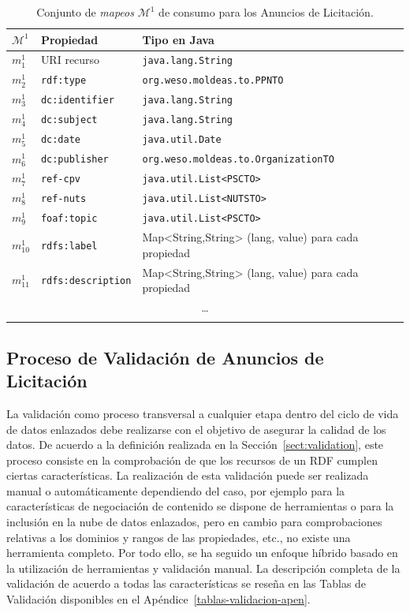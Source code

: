\begin{longtable}[c]{|p{2cm}|p{6cm}|p{6cm}|} 
\hline
  \textbf{$\mathcal{M}^1$} &  \textbf{Propiedad} & \textbf{Tipo en Java} \\\hline
\endhead
 $m^1_1$ & URI recurso     		& \texttt{java.lang.String} \\ \hline
 $m^1_2$ & \texttt{rdf:type}      	& \texttt{org.weso.moldeas.to.PPNTO} \\ \hline
 $m^1_3$ & \texttt{dc:identifier} 	& \texttt{java.lang.String} \\ \hline
 $m^1_4$ & \texttt{dc:subject}    	& \texttt{java.lang.String} \\ \hline
 $m^1_5$ & \texttt{dc:date}    		& \texttt{java.util.Date} \\ \hline
 $m^1_6$ & \texttt{dc:publisher}	& \texttt{org.weso.moldeas.to.OrganizationTO} \\ \hline 
 $m^1_7$ & \texttt{ref-cpv} 		& \texttt{java.util.List<PSCTO> } \\ \hline
 $m^1_8$ & \texttt{ref-nuts} 		& \texttt{java.util.List<NUTSTO> }\\ \hline
 $m^1_9$ & \texttt{foaf:topic} 	& \texttt{java.util.List<PSCTO> } \\ \hline
 $m^1_{10}$ &  \texttt{rdfs:label}  & Map<String,String> (lang, value) para cada propiedad \\ \hline   
 $m^1_{11}$ &  \texttt{rdfs:description}  & Map<String,String> (lang, value) para cada propiedad \\ \hline   
  \multicolumn{3}{|c|}{\ldots} \\ \hline
\hline
\caption{Conjunto de \textit{mapeos} $\mathcal{M}^1$ de consumo para los Anuncios de Licitación.}\label{table:ppn-consumo}\\    
\end{longtable}

\subsection{Proceso de Validación de Anuncios de Licitación}
La validación como proceso transversal a cualquier etapa dentro del ciclo de vida de datos 
enlazados debe realizarse con el objetivo de asegurar la calidad de los datos. De acuerdo a la 
definición realizada en la Sección~\ref{sect:validation}, este proceso consiste en la comprobación 
de que los recursos de un \dataset RDF cumplen ciertas características. La realización de esta validación 
puede ser realizada manual o automáticamente dependiendo del caso, por ejemplo para la características 
de negociación de contenido se dispone de herramientas o para la inclusión en la nube de datos enlazados, pero 
en cambio para comprobaciones relativas a los dominios y rangos de las propiedades, etc., no existe una 
herramienta completo. Por todo ello, se ha seguido un enfoque híbrido basado en la utilización de herramientas 
y validación manual. La descripción completa de la validación de acuerdo a todas las características 
se reseña en las Tablas de Validación disponibles en el Apéndice~\ref{tablas-validacion-apen}.
% 
